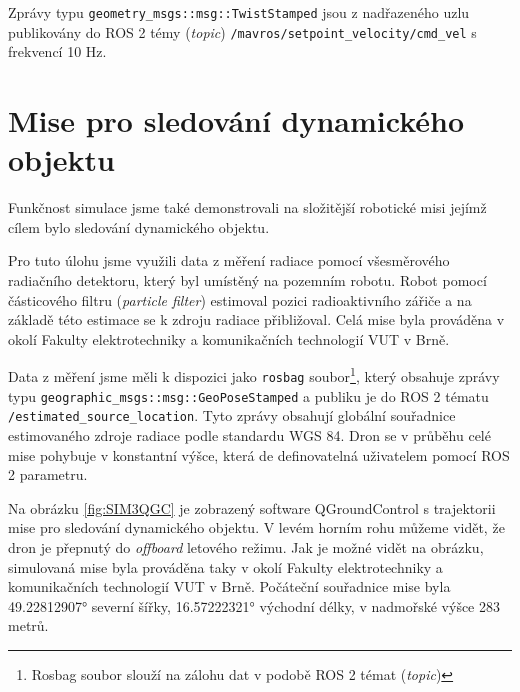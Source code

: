 Zprávy typu \texttt{geometry\_msgs::msg::TwistStamped} jsou z nadřazeného uzlu publikovány do ROS 2 témy (\textit{topic}) \texttt{/mavros/setpoint\_velocity/cmd\_vel} s frekvencí 10 Hz.

\section{Mise pro sledování dynamického objektu}

Funkčnost simulace jsme také demonstrovali na složitější robotické misi jejímž cílem bylo sledování dynamického objektu. 

Pro tuto úlohu jsme využili data z měření radiace pomocí všesměrového radiačního detektoru, který byl umístěný na pozemním robotu. Robot pomocí částicového filtru (\textit{particle filter}) estimoval pozici radioaktivního zářiče a na základě této estimace se k zdroju radiace přibližoval. Celá mise byla prováděna v okolí Fakulty elektrotechniky a komunikačních technologií VUT v Brně.

Data z měření jsme měli k dispozici jako \texttt{rosbag} soubor\footnote{Rosbag soubor slouží na zálohu dat v podobě ROS 2 témat (\textit{topic})}, který obsahuje zprávy typu \texttt{geographic\_msgs::msg::GeoPoseStamped} a publiku je do ROS 2 tématu \texttt{/estimated\_source\_location}. Tyto zprávy obsahují globální souřadnice estimovaného zdroje radiace podle standardu WGS 84. Dron se v průběhu celé mise pohybuje v konstantní výšce, která de definovatelná uživatelem pomocí ROS 2 parametru.

Na obrázku \ref{fig:SIM3QGC} je zobrazený software QGroundControl s trajektorii mise pro sledování dynamického objektu. V levém horním rohu můžeme vidět, že dron je přepnutý do \textit{offboard} letového režimu. Jak je možné vidět na obrázku, simulovaná mise byla prováděna taky v okolí Fakulty elektrotechniky a komunikačních technologií VUT v Brně. Počáteční souřadnice mise byla 49.22812907° severní šířky, 16.57222321° východní délky, v nadmořské výšce 283 metrů.

